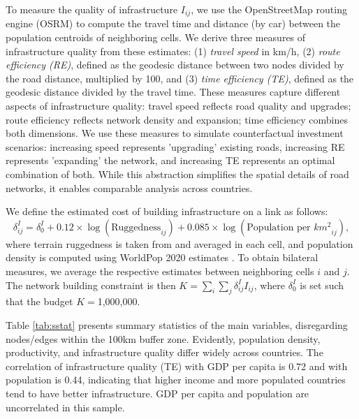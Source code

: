 \documentclass[a4paper]{article}
\begin{document}
To measure the quality of infrastructure $I_{ij}$, we use the OpenStreetMap routing engine (OSRM) \citep{luxen-vetter-2011} to compute the travel time and distance (by car) between the population centroids of neighboring cells. We derive three measures of infrastructure quality from these estimates: (1) \textit{travel speed} in km/h, (2) \textit{route efficiency (RE)}, defined as the geodesic distance between two nodes divided by the road distance, multiplied by 100, and (3) \textit{time efficiency (TE)}, defined as the geodesic distance divided by the travel time. These measures capture different aspects of infrastructure quality: travel speed reflects road quality and upgrades; route efficiency reflects network density and expansion; time efficiency combines both dimensions. We use these measures to simulate counterfactual investment scenarios: increasing speed represents 'upgrading' existing roads, increasing RE represents 'expanding' the network, and increasing TE represents an optimal combination of both. While this abstraction simplifies the spatial details of road networks, it enables comparable analysis across countries. \newline  

We define the estimated cost of building infrastructure on a link as follows:
\begin{equation} \label{eq:cost}
\delta^I_{ij} = \delta^I_0 + 0.12 \times \log(\text{Ruggedness}_{ij}) + 0.085 \times \log(\text{Population per $km^2$}_{ij}),
\end{equation}
where terrain ruggedness is taken from \citet{nunn2012ruggedness} and averaged in each cell, and population density is computed using WorldPop 2020 estimates \citep{tatem2017worldpop}. 
To obtain bilateral measures, we average the respective estimates between neighboring cells $i$ and $j$. The network building constraint is then $K = \sum_i \sum_j \delta^I_{ij} I_{ij}$, where $\delta^I_0$ is set such that the budget $K = $1,000,000. \newline

Table \ref{tab:sstat} presents summary statistics of the main variables, disregarding nodes/edges within the 100km buffer zone. Evidently, population density, productivity, and infrastructure quality differ widely across countries. The correlation of infrastructure quality (TE) with GDP per capita is 0.72 and with population is 0.44, indicating that higher income and more populated countries tend to have better infrastructure. GDP per capita and population are uncorrelated in this sample. 
\end{document}
